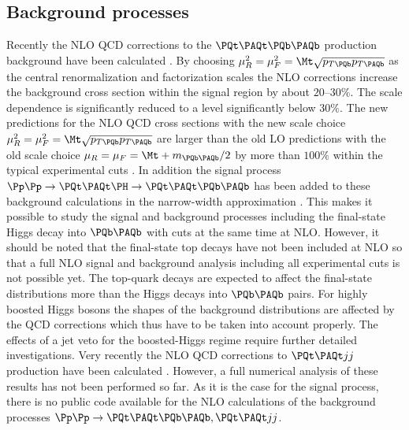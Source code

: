 \subsection{Background processes}
Recently the NLO QCD corrections to the $\PQt\PAQt\PQb\PAQb$ production
background have been calculated
\cite{Bredenstein:2009aj,Bredenstein:2008zb,Bredenstein:2010rs,
Bevilacqua:2009zn,Binoth:2010ra}. By choosing
$\mu_R^2=\mu_F^2=\Mt\sqrt{p_{T\PQb}p_{T\PAQb}}$ as the central
renormalization and factorization scales the NLO corrections increase
the background cross section within the signal region by about $20$--$30\%$.
The scale dependence is significantly reduced to a level significantly
below $30\%$. The new predictions for the NLO QCD cross sections with the
new scale choice $\mu_R^2=\mu_F^2=\Mt\sqrt{p_{T\PQb}p_{T\PAQb}}$ are
larger than the old LO predictions with the old scale choice
$\mu_R=\mu_F=\Mt+m_{\PQb\PAQb}/2$ by more than $100\%$ within the typical
experimental cuts \cite{Bredenstein:2010rs}. In addition the signal
process $\Pp\Pp\to \PQt\PAQt\PH\to \PQt\PAQt\PQb\PAQb$ has been added to
these background calculations in the narrow-width approximation
\cite{Binoth:2010ra}.  This makes it possible to study the signal and
background processes including the final-state Higgs decay into
$\PQb\PAQb$ with cuts at the same time at NLO. However, it should be
noted that the final-state top decays have not been included at NLO so
that a full NLO signal and background analysis including all
experimental cuts is not possible yet. The top-quark decays are
expected to affect the final-state distributions more than the Higgs
decays into $\PQb\PAQb$ pairs. For highly boosted Higgs bosons the
shapes of the background distributions are affected by the QCD
corrections which thus have to be taken into account properly. The
effects of a jet veto for the boosted-Higgs regime require further
detailed investigations. Very recently the NLO QCD corrections to
$\PQt\PAQt jj$ production have been calculated \cite{Bevilacqua:2010ve}.
However, a full numerical analysis of these results has not been
performed so far.  As it is the case for the signal process, there is no
public code available for the NLO calculations of the background
processes $\Pp\Pp\to\PQt\PAQt\PQb\PAQb, \PQt\PAQt jj$.

